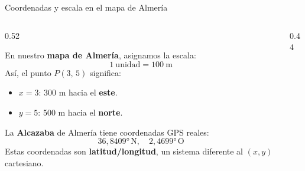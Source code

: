 \documentclass[aspectratio=169, 10pt, spanish]{beamer}
\begin{document}
\begin{frame}{Coordenadas y escala en el mapa de Almería}
  \begin{columns}[c]
    \begin{column}{0.52\textwidth}
      \begin{teoriabox}
        \AlmFontSmall
        En nuestro \textbf{mapa de Almería},
        asignamos la escala:
        \[
          1\ \text{unidad} = 100\ \text{m}
        \]
        Así, el punto $P(3,\,5)$ significa:
        \begin{itemize}
          \item $x=3$: 300 m hacia el \textbf{este}.
          \item $y=5$: 500 m hacia el \textbf{norte}.
        \end{itemize}
      \end{teoriabox}
      \vspace{6pt}
      \begin{ejemplobox}
        \AlmFontFootnote
        La \textbf{Alcazaba} de Almería tiene
        coordenadas GPS reales:\\
        \[
          36{,}8409°\,\text{N}, \quad 2{,}4699°\,\text{O}
        \]
        Estas coordenadas son \textbf{latitud/longitud},
        un sistema diferente al $(x,y)$ cartesiano.
      \end{ejemplobox}
    \end{column}
    \begin{column}{0.44\textwidth}
      \begin{center}
\end{center}
\end{column}
\end{columns}
\end{frame}
\end{document}

